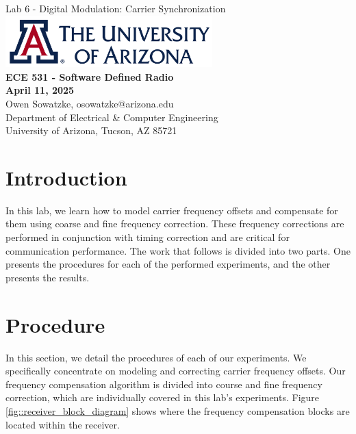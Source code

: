 \documentclass{article}
\begin{document}
\begin{titlepage}
	\centering
	{\huge Lab 6 - Digital Modulation: Carrier Synchronization}\\[0.25 in]
	\includegraphics[width=0.6\textwidth]{ua_logo.png}\\[0.25 in]
	{\large \textbf{ECE 531 - Software Defined Radio\\[0.25 in]
	April 11, 2025\\[0.25 in]}}
	{\large Owen Sowatzke, osowatzke@arizona.edu\\[0.05 in]
	Department of Electrical \& Computer Engineering\\[0.05 in]
	University of Arizona, Tucson, AZ 85721\\[0.5 in]}
	\hypersetup{linkcolor=navy-blue}
	\noindent\hrulefill
	\tableofcontents
	\noindent\hrulefill
\end{titlepage}


\section{Introduction}

In this lab, we learn how to model carrier frequency offsets and compensate for them using coarse and fine frequency correction. These frequency corrections are performed in conjunction with timing correction and are critical for communication performance. The work that follows is divided into two parts. One presents the procedures for each of the performed experiments, and the other presents the results.

\section{Procedure}

In this section, we detail the procedures of each of our experiments. We specifically concentrate on modeling and correcting carrier frequency offsets. Our frequency compensation algorithm is divided into course and fine frequency correction, which are individually covered in this lab's experiments. Figure \ref{fig::receiver_block_diagram} shows where the frequency compensation blocks are located within the receiver.
\end{document}
